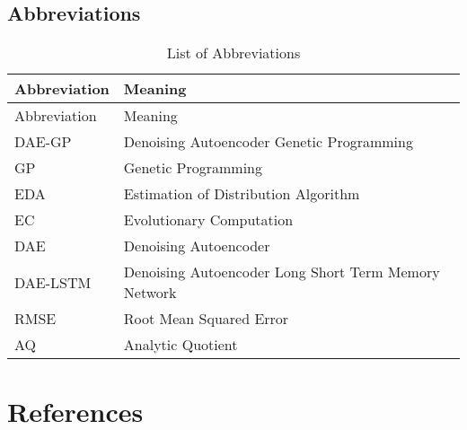 \documentclass[
  11pt,
]{article}
\begin{document}
\hypertarget{IIb}{%
\subsection*{Abbreviations}\label{IIb}}

\begin{longtable}[]{@{}ll@{}}
\caption{\label{tab:abbreviations}List of Abbreviations}\tabularnewline
\toprule\noalign{}
Abbreviation & Meaning \\
\midrule\noalign{}
\endfirsthead
\toprule\noalign{}
Abbreviation & Meaning \\
\midrule\noalign{}
\endhead
\bottomrule\noalign{}
\endlastfoot
DAE-GP & Denoising Autoencoder Genetic Programming \\
GP & Genetic Programming \\
EDA & Estimation of Distribution Algorithm \\
EC & Evolutionary Computation \\
DAE & Denoising Autoencoder \\
DAE-LSTM & Denoising Autoencoder Long Short Term Memory Network \\
RMSE & Root Mean Squared Error \\
AQ & Analytic Quotient \\
\end{longtable}

\newpage

\hypertarget{III}{%
\section*{References}\label{III}}
\end{document}
